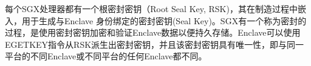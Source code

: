 
每个SGX处理器都有一个根密封密钥（Root Seal Key, RSK)，其在制造过程中嵌入，用于生成与Enclave 身份绑定的密封密钥(Seal Key)。SGX有一个称为密封的过程，是使用密封密钥加密和验证Enclave数据以便持久存储。Enclave可以使用EGETKEY指令从RSK派生出密封密钥，并且该密封密钥具有唯一性，即与同一平台的不同Enclave或不同平台的任何Enclave都不同。



%
